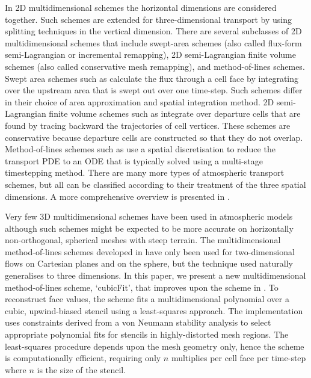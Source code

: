 In 2D multidimensional schemes the horizontal dimensions are considered together.  Such schemes are extended for three-dimensional transport by using splitting techniques in the vertical dimension.
There are several subclasses of 2D multidimensional schemes that include swept-area schemes (also called flux-form semi-Lagrangian or incremental remapping), 2D semi-Lagrangian finite volume schemes (also called conservative mesh remapping), and method-of-lines schemes.
Swept area schemes such as \citep{lashley2002,skamarock-menchaca2010,lauritzen2011,thuburn2014} calculate the flux through a cell face by integrating over the upstream area that is swept out over one time-step.  Such schemes differ in their choice of area approximation and spatial integration method.
2D semi-Lagrangian finite volume schemes such as \citep{iske-kaeser2004,lauritzen2010} integrate over departure cells that are found by tracing backward the trajectories of cell vertices.  These schemes are conservative because departure cells are constructed so that they do not overlap.
Method-of-lines schemes such as \citep{weller2009,skamarock-gassmann2011} use a spatial discretisation to reduce the transport PDE to an ODE that is typically solved using a multi-stage timestepping method.
There are many more types of atmospheric transport schemes, but all can be classified according to their treatment of the three spatial dimensions.  A more comprehensive overview is presented in \cite{lauritzen2014}.

Very few 3D multidimensional schemes have been used in atmospheric models \citep[e.g.][]{gassmann2013} although such schemes might be expected to be more accurate on horizontally non-orthogonal, spherical meshes with steep terrain.  The multidimensional method-of-lines schemes developed in \citep{weller2009,weller-shahrokhi2014} have only been used for two-dimensional flows on Cartesian planes and on the sphere, but the technique used naturally generalises to three dimensions.
In this paper, we present a new multidimensional method-of-lines scheme, `cubicFit', that improves upon the scheme in \citep{weller-shahrokhi2014}.  To reconstruct face values, the scheme fits a multidimensional polynomial over a cubic, upwind-biased stencil using a least-squares approach.  The implementation uses constraints derived from a von Neumann stability analysis to select appropriate polynomial fits for stencils in highly-distorted mesh regions.  The least-squares procedure depends upon the mesh geometry only, hence the scheme is computationally efficient, requiring only $n$ multiplies per cell face per time-step where $n$ is the size of the stencil.


